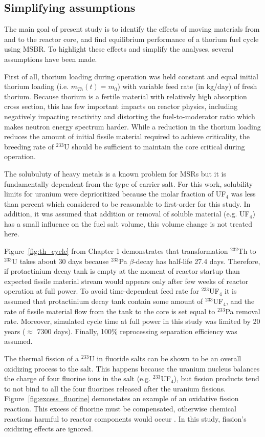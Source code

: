 \subsection{Simplifying assumptions}
The main goal of present study is to identify the effects of moving materials from and to the reactor core, and find equilibrium performance of a thorium fuel cycle using \gls{MSBR}. To highlight these effects and simplify the analyses, several assumptions have been made.

First of all, thorium loading during operation was held constant and equal initial thorium loading (i.e. $m_{Th}(t)=m_0$) with variable feed rate (in kg/day) of fresh thorium. Because thorium is a fertile material with relatively high absorption cross section, this has few important impacts on reactor physics, including negatively impacting reactivity and distorting the fuel-to-moderator ratio which makes neutron energy spectrum harder. While a reduction in the thorium loading reduces the amount of initial fissile material required to achieve criticality, the breeding rate of $^{233}$U should be sufficient to maintain the core critical during operation.

The solubuluty of heavy metals is a known problem for \glspl{MSR} but it is fundamentally dependent from the type of carrier salt. For this work, solubility limits for uranium were deprioritized because the molar fraction of UF$_4$ was less than percent which considered to be reasonable to first-order for this study. In addition, it was assumed that addition or removal of soluble material (e.g. UF$_4$) has a small influence on the fuel salt volume, this volume change is not treated here.

Figure~\ref{fig:th_cycle} from Chapter 1 demonstrates that transformation $^{232}$Th to $^{233}$U takes about 30 days because $^{233}$Pa $\beta$-decay has half-life 27.4 days. Therefore, if protactinium decay tank is empty at the moment of reactor startup than expected fissile material stream would appears only after few weeks of reactor operation at full power. To avoid time-dependent feed rate for $^{233}$UF$_4$ it is assumed that protactinium decay tank contain some amount of $^{233}$UF$_4$, and the rate of fissile material flow from the tank to the core is set equal to $^{233}$Pa removal rate. Moreover, simulated cycle time at full power in this study was limited by 20 years ($\approx$ 7300 days). Finally, 100\% reprocessing separation efficiency was assumed.

The thermal fission of a $^{233}$U in fluoride salts can be shown to be an overall oxidizing process to the salt. This happens because the uranium nucleus balances the charge of four fluorine ions in the salt (e.g. $^{233}$UF$_4$), but fission products tend to not bind to all the four fluorines released after the uranium fissions. Figure~\ref{fig:excess_fluorine} demonstates an example of an oxidative fission reaction. This excess of fluorine must be compensated, otherwise chemical reactions harmful to reactor components would occur \cite{ridley_method_2017}. In this study, fission’s oxidizing effects are ignored.

